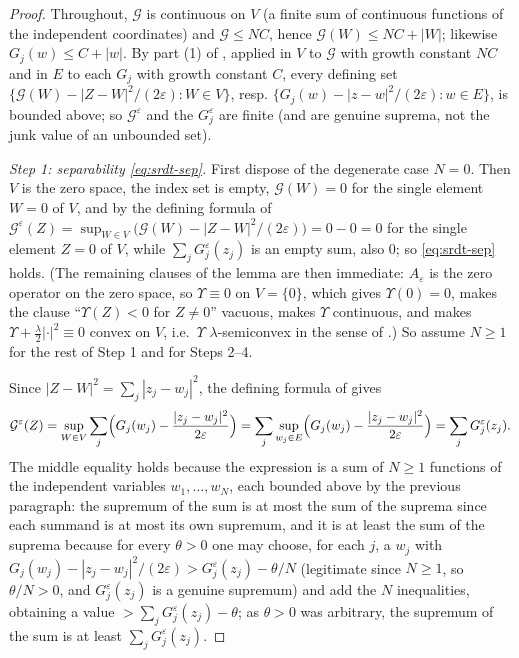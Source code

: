 \begin{proof}
Throughout, $\mathcal G$ is continuous on $V$ (a finite sum of continuous
functions of the independent coordinates) and $\mathcal G\le NC$, hence
$\mathcal G(W)\le NC+|W|$; likewise $G_j(w)\le C+|w|$. By part (1) of
, applied in $V$ to $\mathcal G$ with growth
constant $NC$ and in $E$ to each $G_j$ with growth constant $C$, every defining
set
$\{\mathcal G(W)-|Z-W|^2/(2\varepsilon):W\in V\}$, resp.
$\{G_j(w)-|z-w|^2/(2\varepsilon):w\in E\}$, is bounded above; so
$\mathcal G^\varepsilon$ and the $G_j^\varepsilon$ are finite (and are genuine
suprema, not the junk value of an unbounded set).

\emph{Step 1: separability \eqref{eq:srdt-sep}.}
First dispose of the degenerate case $N=0$. Then $V$ is the zero space, the
index set is empty, $\mathcal G(W)=0$ for the single element $W=0$ of $V$, and
by the defining formula of 
$\mathcal G^\varepsilon(Z)=\sup_{W\in V}\bigl(\mathcal G(W)
-|Z-W|^2/(2\varepsilon)\bigr)=0-0=0$ for the single element $Z=0$ of $V$,
while $\sum_jG_j^\varepsilon(z_j)$ is an empty sum, also $0$; so
\eqref{eq:srdt-sep} holds. (The remaining clauses of the lemma are then
immediate: $A_\varepsilon$ is the zero operator on the zero space, so
$\Upsilon\equiv0$ on $V=\{0\}$, which gives $\Upsilon(0)=0$, makes the clause
``$\Upsilon(Z)<0$ for $Z\ne0$'' vacuous, makes $\Upsilon$ continuous, and makes
$\Upsilon+\tfrac\lambda2|\cdot|^2\equiv0$ convex on $V$, i.e.\ $\Upsilon$
$\lambda$-semiconvex in the sense of .) So assume
$N\ge1$ for the rest of Step 1 and for Steps 2--4.

Since $|Z-W|^2=\sum_j|z_j-w_j|^2$, the defining formula of
 gives
\[
  \mathcal G^\varepsilon(Z)
   =\sup_{W\in V}\sum_j\Bigl(G_j(w_j)-\frac{|z_j-w_j|^2}{2\varepsilon}\Bigr)
   =\sum_j\sup_{w_j\in E}\Bigl(G_j(w_j)-\frac{|z_j-w_j|^2}{2\varepsilon}\Bigr)
   =\sum_jG_j^\varepsilon(z_j).
\]
The middle equality holds because the expression is a sum of $N\ge1$ functions
of the independent variables $w_1,\dots,w_N$, each bounded above by the previous
paragraph: the supremum of the sum is at most the sum of the suprema since each
summand is at most its own supremum, and it is at least the sum of the suprema
because for every $\theta>0$ one may choose, for each $j$, a $w_j$ with
$G_j(w_j)-|z_j-w_j|^2/(2\varepsilon)>G_j^\varepsilon(z_j)-\theta/N$ (legitimate
since $N\ge1$, so $\theta/N>0$, and $G_j^\varepsilon(z_j)$ is a genuine
supremum) and add the $N$ inequalities, obtaining a value
$>\sum_jG_j^\varepsilon(z_j)-\theta$; as $\theta>0$ was arbitrary, the
supremum of the sum is at least $\sum_jG_j^\varepsilon(z_j)$.


\end{proof}
